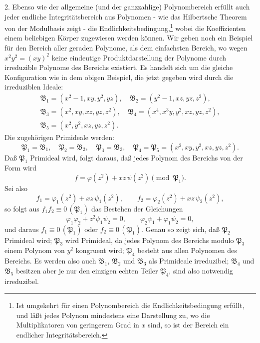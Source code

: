 \documentclass[11pt]{article}
\newcommand{\ideal}[1]{\mathfrak{#1}}
\newcommand{\eqzero}[1]{\equiv 0\,(#1)}
\begin{document}
2. Ebenso wie der allgemeine (und der ganzzahlige) Polynombereich erfüllt auch jeder endliche Integritätsbereich aus Polynomen - wie das Hilbertsche Theorem von der Modulbasis zeigt - die Endlichkeitsbedingung,\footnote{Ist umgekehrt für einen Polynombereich die Endlichkeitsbedingung erfüllt, und läßt jedes Polynom mindestens eine Darstellung zu, wo die Multiplikatoren von geringerem Grad in $x$ sind, so ist der Bereich ein endlicher Integritätsbereich.} wobei die Koeffizienten einem beliebigen Körper zugewiesen werden können. Wir geben noch ein Beispiel für den Bereich aller geraden Polynome, als dem einfachsten Bereich, wo wegen $x^2y^2=(xy)^2$ keine eindeutige Produktdarstellung der Polynome durch irreduzible Polynome des Bereichs existiert. Es handelt sich um die gleiche Konfiguration wie in dem obigen Beispiel, die jetzt gegeben wird durch die irreduziblen Ideale:
\[
\begin{gathered}
 \ideal B_1=(x^2-1,xy,y^2,yz),\quad
 \ideal B_2=(y^2-1,xz,yz,z^2),\\
 \ideal B_3=(x^2,xy,xz,yz,z^2),\quad
 \ideal B_4=(x^4,x^3y,y^2,xz,yz,z^2),\\
 \ideal B_5=(x^2,y^2,xz,yz,z^2).
\end{gathered}
\]
Die zugehörigen Primideale werden:
\[
 \ideal P_1=\ideal B_1,
 \quad \ideal P_2=\ideal B_2,
 \quad \ideal P_3=\ideal B_3,
 \quad \ideal P_4=\ideal P_5=(x^2,xy,y^2,xz,yz,z^2).
\]
Daß $\ideal P_1$ Primideal wird, folgt daraus, daß jedes Polynom des Bereichs von der Form wird
\[
 f=\varphi(z^2)+xz\,\psi(z^2)\pmod{\ideal P_1}.
\]
Sei also
\[
 f_1=\varphi_1(z^2)+xz\,\psi_1(z^2),
 \qquad
 f_2=\varphi_2(z^2)+xz\,\psi_2(z^2),
\]
so folgt aus $f_1f_2\eqzero{\ideal P_1}$ das Bestehen der Gleichungen
\[
 \varphi_1\varphi_2+z^2\psi_1\psi_2=0,
 \qquad
 \varphi_2\psi_1+\varphi_1\psi_2=0,
\]
und daraus $f_1\eqzero{\ideal P_1}$ oder $f_2\eqzero{\ideal P_1}$. Genau so zeigt sich, daß $\ideal P_2$ Primideal wird; $\ideal P_3$ wird Primideal, da jedes Polynom des Bereichs modulo $\ideal P_3$ einem Polynom von $y^2$ kongruent wird; $\ideal P_4$ besteht aus allen Polynomen des Bereichs. Es werden also auch $\ideal B_1$, $\ideal B_2$ und $\ideal B_3$ als Primideale irreduzibel; $\ideal B_4$ und $\ideal B_5$ besitzen aber je nur den einzigen echten Teiler $\ideal P_4$, sind also notwendig irreduzibel.
\end{document}
